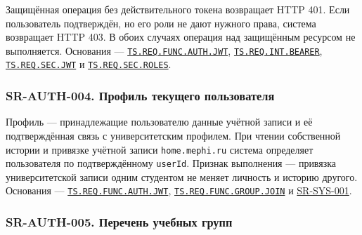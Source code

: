 \documentclass[12pt,a4paper]{article}
\begin{document}
Защищённая операция без действительного токена возвращает HTTP 401. Если пользователь подтверждён, но его роли не дают нужного права, система возвращает HTTP 403. В обоих случаях операция над защищённым ресурсом не выполняется. Основания --- {\href{../02\_Техническое\_задание/DOC-02\_Техническое\_задание.pdf\#ts-req-func-auth-jwt}{\texttt{TS.\allowbreak{}REQ.\allowbreak{}FUNC.\allowbreak{}AUTH.\allowbreak{}JWT}}}, {\href{../02\_Техническое\_задание/DOC-02\_Техническое\_задание.pdf\#ts-req-int-bearer}{\texttt{TS.\allowbreak{}REQ.\allowbreak{}INT.\allowbreak{}BEARER}}}, {\href{../02\_Техническое\_задание/DOC-02\_Техническое\_задание.pdf\#ts-req-sec-jwt}{\texttt{TS.\allowbreak{}REQ.\allowbreak{}SEC.\allowbreak{}JWT}}} и {\href{../02\_Техническое\_задание/DOC-02\_Техническое\_задание.pdf\#ts-req-sec-roles}{\texttt{TS.\allowbreak{}REQ.\allowbreak{}SEC.\allowbreak{}ROLES}}}.

\subsubsection{SR-AUTH-004. Профиль текущего пользователя}\label{sr-auth-004-ux43fux440ux43eux444ux438ux43bux44c-ux442ux435ux43aux443ux449ux435ux433ux43e-ux43fux43eux43bux44cux437ux43eux432ux430ux442ux435ux43bux44f}

\hypertarget{sr-auth-004-профиль-текущего-пользователя}{}

\hypertarget{sr-auth-004}{}

Профиль --- принадлежащие пользователю данные учётной записи и её подтверждённая связь с университетским профилем. При чтении собственной истории и привязке учётной записи \texttt{home.\allowbreak{}mephi.\allowbreak{}ru} система определяет пользователя по подтверждённому \texttt{userId}. Признак выполнения --- привязка университетской записи одним студентом не меняет личность и историю другого. Основания --- {\href{../02\_Техническое\_задание/DOC-02\_Техническое\_задание.pdf\#ts-req-func-auth-jwt}{\texttt{TS.\allowbreak{}REQ.\allowbreak{}FUNC.\allowbreak{}AUTH.\allowbreak{}JWT}}}, {\href{../02\_Техническое\_задание/DOC-02\_Техническое\_задание.pdf\#ts-req-func-group-join}{\texttt{TS.\allowbreak{}REQ.\allowbreak{}FUNC.\allowbreak{}GROUP.\allowbreak{}JOIN}}} и {\hyperlink{sr-sys-001}{SR-SYS-001}}.

\subsubsection{SR-AUTH-005. Перечень учебных групп}\label{sr-auth-005-ux43fux435ux440ux435ux447ux435ux43dux44c-ux443ux447ux435ux431ux43dux44bux445-ux433ux440ux443ux43fux43f}
\end{document}
